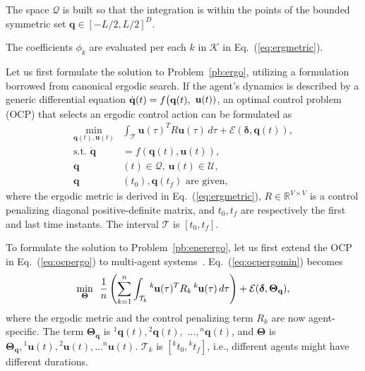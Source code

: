 \documentclass[letterpaper,10pt,conference,twoside]{IEEEtran}
\theoremstyle{definition}
\begin{document}
The space $\mathcal{Q}$ is built so that the integration is within the points of the bounded symmetric set $\mathbf{q}\in[-L/2,L/2]^D$.

The coefficients $\phi_k$ are evaluated per each $k$ in $\mathcal{K}$ in Eq.~(\ref{eq:ergmetric}).

Let us first formulate the solution to Problem~\ref{pb:ergo}, utilizing a formulation borrowed from canonical ergodic search.
If the agent's dynamics is described by a generic differential equation $\dot{\mathbf{q}}(t)=f\big({\small\mathbf{q}(t),}$ ${\small\mathbf{u}(t)})$, an optimal control problem (OCP) that selects an ergodic control action can be formulated as~\cite{ayvali2017ergodic}
\begin{subequations}\label{eq:ocpergo}\begin{align}
  \min_{\mathbf{q}(t),\mathbf{u}(t)}&\int_{\mathcal{T}}\mathbf{u}(\tau)^TR\mathbf{u}(\tau)\,d\tau+{\mathcal{E}(\boldsymbol{\delta},\mathbf{q}(t))},\label{eq:ocpergomin}\\
  \text{s.t. }\dot{\mathbf{q}}&=f(\mathbf{q}(t),\mathbf{u}(t)),\\
  \mathbf{q}&(t)\in\mathcal{Q},\,\mathbf{u}(t)\in\mathcal{U},\\
  \mathbf{q}&(t_0), \mathbf{q}(t_f)\text{ are given},\label{eq:ocpconsttotf}
\end{align}\end{subequations}
where the ergodic metric is derived in Eq.~(\ref{eq:ergmetric}), $R\in\mathbb{R}^{V\times V}$ is a control penalizing diagonal positive-definite matrix, and $t_0, t_f$ are respectively the first and last time instants. 
The interval $\mathcal{T}$ is $[t_0, t_f]$.%

To formulate the solution to Problem~\ref{pb:enerergo}, let us first extend the OCP in Eq.~(\ref{eq:ocpergo}) to multi-agent systems~\cite{coffin2022multi}. Eq.~(\ref{eq:ocpergomin}) becomes
\begin{equation}\label{eq:ocpergomulti}
  \min_{\boldsymbol{\Theta}}\,\,\,{\frac{1}{n}\left(\sum_{k=1}^{n}\int_{\mathcal{T}_k}{}^k\hspace*{-.1ex}\mathbf{u}(\tau)^TR_k\,{}^k\hspace*{-.1ex}\mathbf{u}(\tau)\,d\tau\right)+\mathcal{E}(\boldsymbol{\delta},\boldsymbol{\Theta}_{\mathbf{q}})},
\end{equation}
where the ergodic metric and the control penalizing term $R_k$ are now agent-specific. The term $\boldsymbol{\Theta}_{\mathbf{q}}$ is ${}^1\mathbf{q}(t),{}^2\mathbf{q}(t),$ $\dots,{}^n\mathbf{q}(t)$, and $\boldsymbol{\Theta}$ is $\boldsymbol{\Theta}_{\mathbf{q}},{}^1\mathbf{u}(t),{}^2\mathbf{u}(t),\dots{}^n\mathbf{u}(t)$. $\mathcal{T}_k$ is $[{}^kt_0, {}^kt_f]$, i.e., different agents might have different durations.
\end{document}
